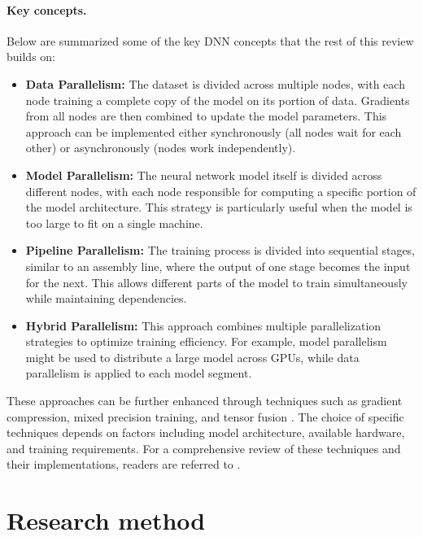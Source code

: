 \paragraph{Key concepts.}
Below are summarized some of the key DNN concepts that the rest of this review builds on:

\begin{itemize}
	\item \textbf{Data Parallelism:}
	      The dataset is divided across multiple nodes, with each node training a complete copy of the
	      model on its portion of data. Gradients from all nodes are then combined to update the model parameters.
	      This approach can be implemented either synchronously (all nodes wait for each other) or asynchronously (nodes work independently).

	\item \textbf{Model Parallelism:}
	      The neural network model itself is divided across different nodes, with each node responsible
	      for computing a specific portion of the model architecture. This strategy is particularly useful
	      when the model is too large to fit on a single machine.

	\item \textbf{Pipeline Parallelism:}
	      The training process is divided into sequential stages, similar to an assembly line,
	      where the output of one stage becomes the input for the next. This allows different parts
	      of the model to train simultaneously while maintaining dependencies.

	\item \textbf{Hybrid Parallelism:}
	      This approach combines multiple parallelization strategies to optimize training efficiency.
	      For example, model parallelism might be used to distribute a large model across GPUs, while
	      data parallelism is applied to each model segment.
\end{itemize}

These approaches can be further enhanced through techniques such as gradient compression, mixed
precision training, and tensor fusion \cite{dehghani_distributed_2023}. The choice of specific
techniques depends on factors including model architecture, available hardware, and training
requirements. For a comprehensive review of these techniques and their implementations, readers are
referred to \cite{chahal_hitchhikers_2018}.

\section{Research method}
\label{sec:protocol}

